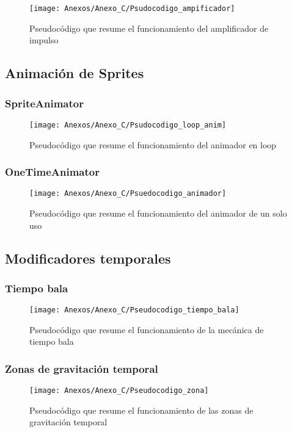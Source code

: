 \begin{figure}[h]
\centering
\texttt{[image: Anexos/Anexo\_C/Psudocodigo\_ampificador]}
\caption{Pseudocódigo que resume el funcionamiento del amplificador de impulso}
\end{figure}

\clearpage
\subsection{Animación de Sprites}
\subsubsection{SpriteAnimator}

\begin{figure}[h]
\centering
\texttt{[image: Anexos/Anexo\_C/Psudocodigo\_loop\_anim]}
\caption{Pseudocódigo que resume el funcionamiento del animador en loop}
\end{figure}

\subsubsection{OneTimeAnimator}

\begin{figure}[h]
\centering
\texttt{[image: Anexos/Anexo\_C/Psuedocodigo\_animador]}
\caption{Pseudocódigo que resume el funcionamiento del animador de un solo uso}
\end{figure}

\subsection{Modificadores temporales}
\subsubsection{Tiempo bala}

\begin{figure}[h]
\centering
\texttt{[image: Anexos/Anexo\_C/Pseudocodigo\_tiempo\_bala]}
\caption{Pseudocódigo que resume el funcionamiento de la mecánica de tiempo bala}
\end{figure}

\clearpage
\subsubsection{Zonas de gravitación temporal}

\begin{figure}[h]
\centering
\texttt{[image: Anexos/Anexo\_C/Pseudocodigo\_zona]}
\caption{Pseudocódigo que resume el funcionamiento de las zonas de gravitación temporal}
\end{figure}

